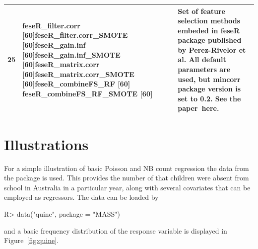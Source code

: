 \documentclass[article]{jss}
\begin{document}
\begin{tabular}{|p{0.2in}|p{2.0in}|p{3.9in}|}
25 & feseR\_filter.corr [60]\newline feseR\_filter.corr\_SMOTE [60]\newline feseR\_gain.inf [60]\newline feseR\_gain.inf\_SMOTE [60]\newline feseR\_matrix.corr [60]\newline feseR\_matrix.corr\_SMOTE [60]\newline feseR\_combineFS\_RF [60] feseR\_combineFS\_RF\_SMOTE [60] & Set of feature selection methods embeded in feseR package published by Perez-Rivelor et al. All default parameters are used, but mincorr package version is set to 0.2. See the paper~here.  \\ \hline
\end{tabular}




\section{Illustrations} \label{sec:illustrations}

For a simple illustration of basic Poisson and NB count regression the
 data from the  package is used. This provides the number
of  that children were absent from school in Australia in a
particular year, along with several covariates that can be employed as regressors.
The data can be loaded by
%
\begin{Schunk}
\begin{Sinput}
R> data("quine", package = "MASS")
\end{Sinput}
\end{Schunk}
%
and a basic frequency distribution of the response variable is displayed in
Figure~\ref{fig:quine}.
\end{document}
